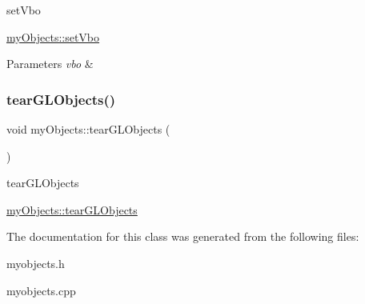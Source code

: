 set\+Vbo 

\hyperlink{classmyObjects_a1ec9026bb331e4d07d8da372424bbcdf}{my\+Objects\+::set\+Vbo}


\begin{DoxyParams}{Parameters}
{\em vbo} & \\
\hline
\end{DoxyParams}
\mbox{\label{classmyObjects_a83118c7f81624026cd3798dcde6a9a34}} 
\subsubsection{\texorpdfstring{tear\+G\+L\+Objects()}{tearGLObjects()}}
{\footnotesize\ttfamily void my\+Objects\+::tear\+G\+L\+Objects (\begin{DoxyParamCaption}{ }\end{DoxyParamCaption})\hspace{0.3cm}{\ttfamily [virtual]}}



tear\+G\+L\+Objects 

\hyperlink{classmyObjects_a83118c7f81624026cd3798dcde6a9a34}{my\+Objects\+::tear\+G\+L\+Objects} 

The documentation for this class was generated from the following files\+:\begin{DoxyCompactItemize}
\item 
myobjects.\+h\item 
myobjects.\+cpp\end{DoxyCompactItemize}
